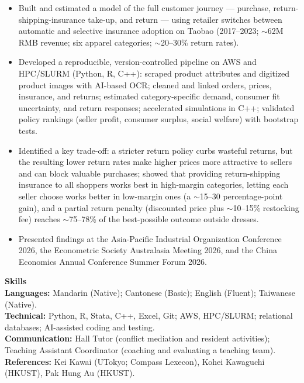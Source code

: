 \documentclass[11pt,letterpaper]{article}
\begin{document}
\begin{itemize}
  \item Built and estimated a model of the full customer journey --- purchase, return-shipping-insurance take-up, and return --- using retailer switches between automatic and selective insurance adoption on Taobao (2017--2023; \(\sim\)62M RMB revenue; six apparel categories; \(\sim\)20--30\% return rates).
  \item Developed a reproducible, version-controlled pipeline on AWS and HPC/SLURM (Python, R, C++): scraped product attributes and digitized product images with AI-based OCR; cleaned and linked orders, prices, insurance, and returns; estimated category-specific demand, consumer fit uncertainty, and return responses; accelerated simulations in C++; validated policy rankings (seller profit, consumer surplus, social welfare) with bootstrap tests.
  \item Identified a key trade-off: a stricter return policy curbs wasteful returns, but the resulting lower return rates make higher prices more attractive to sellers and can block valuable purchases; showed that providing return-shipping insurance to all shoppers works best in high-margin categories, letting each seller choose works better in low-margin ones (a \(\sim\)15--30 percentage-point gain), and a partial return penalty (discounted price plus \(\sim\)10--15\% restocking fee) reaches \(\sim\)75--78\% of the best-possible outcome outside dresses.
  \item Presented findings at the Asia-Pacific Industrial Organization Conference 2026, the Econometric Society Australasia Meeting 2026, and the China Economics Annual Conference Summer Forum 2026.
\end{itemize}

\vspace{0.15pt}

{\large \textbf{Skills}}\\[-0.5pt]
\textbf{Languages:} Mandarin (Native); Cantonese (Basic); English (Fluent); Taiwanese (Native).\\
\textbf{Technical:} Python, R, Stata, C++, Excel, Git; AWS, HPC/SLURM; relational databases; AI-assisted coding and testing.\\
\textbf{Communication:} Hall Tutor (conflict mediation and resident activities); Teaching Assistant Coordinator (coaching and evaluating a teaching team).\\
\textbf{References:} Kei Kawai (UTokyo; Compass Lexecon), Kohei Kawaguchi (HKUST), Pak Hung Au (HKUST).
\end{document}
